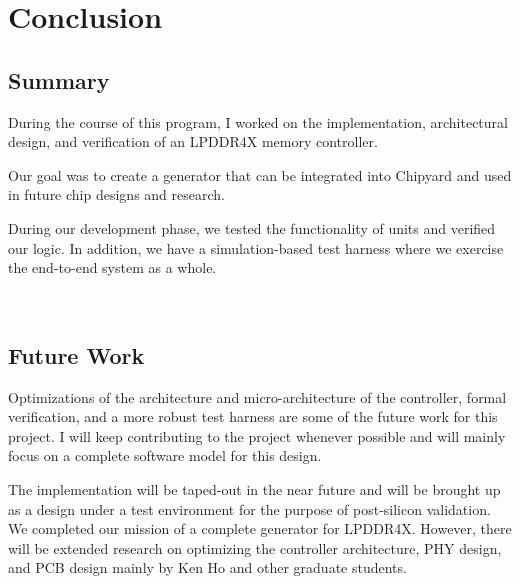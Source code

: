 \chapter{Conclusion}
\section{Summary}
During the course of this program, I worked on the implementation, architectural design, and verification of an LPDDR4X memory controller. 

Our goal was to create a generator that can be integrated into Chipyard and used in future chip designs and research. 

During our development phase, we tested the functionality of units and verified our logic. In addition, we have a simulation-based test harness where we exercise the end-to-end system as a whole. 

\

\section{Future Work}
Optimizations of the architecture and micro-architecture of the controller, formal verification, and a more robust test harness are some of the future work for this project. I will keep contributing to the project whenever possible and will mainly focus on a complete software model for this design.

The implementation will be taped-out in the near future and will be brought up as a design under a test environment for the purpose of post-silicon validation. We completed our mission of a complete generator for LPDDR4X. However, there will be extended research on optimizing the controller architecture, PHY design, and PCB design mainly by Ken Ho and other graduate students. 